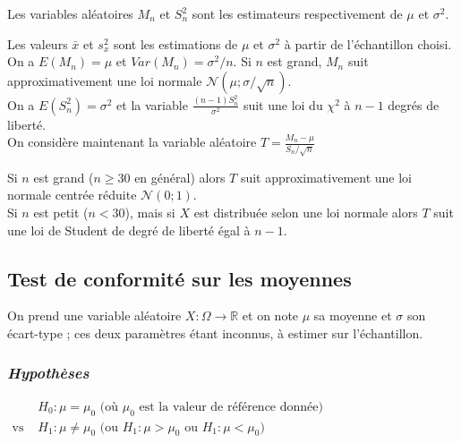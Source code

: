 \documentclass[12pt, a4paper]{article}
\begin{document}
Les variables aléatoires $M_n$ et $S_n^2$ sont les estimateurs respectivement de $\mu$ et $\sigma^2$. 

Les valeurs $\bar{x}$ et $s_x^2$ sont les estimations de $\mu$ et $\sigma^2$ à partir de l'échantillon choisi.\\


 On a $E(M_n)=\mu$ et $Var(M_n)=\sigma^2/n$.
Si $n$ est grand, $M_n$ suit approximativement une loi normale $\mathcal{N}(\mu;\sigma/\sqrt{n})$. \\

 On a $E(S_n^2)=\sigma^2$ et %
la variable $\frac{(n-1)S_n^2}{\sigma^2}$ suit une loi du $\chi^2$ à $n-1$ degrés de liberté.\\


On considère maintenant la variable aléatoire $\displaystyle T=\frac{M_n-\mu}{S_n/\sqrt{n}}$ 

 Si $n$ est grand ($n\geq 30$ en général) alors $T$ suit approximativement une
loi normale centrée réduite $\mathcal{N}(0;1)$.\\

 Si $n$ est petit ($n < 30$), mais si $X$ est distribuée selon une loi normale alors $T$ suit une loi de Student
de degré de liberté égal à $n-1$.

\subsection{Test de conformité sur les moyennes}
On prend une variable aléatoire $X : \Omega \longrightarrow \mathbb{R}$ et on note $\mu$ sa moyenne et
$\sigma$ son écart-type ; ces deux paramètres étant inconnus, à estimer sur l'échantillon. %
 
\subsubsection*{\it Hypothèses}
\begin{center}
$
\begin{array}{ll}
& H_0: \mu = \mu_0 \mbox{ (où } \mu_0 \mbox{ est la valeur de référence donnée)} \\
\mbox{vs } & H_1: \mu \neq \mu_0  \mbox{ (ou } H_1: \mu > \mu_0 \mbox{ ou } H_1: \mu < \mu_0)
\end{array}
$
\end{center}
\end{document}

